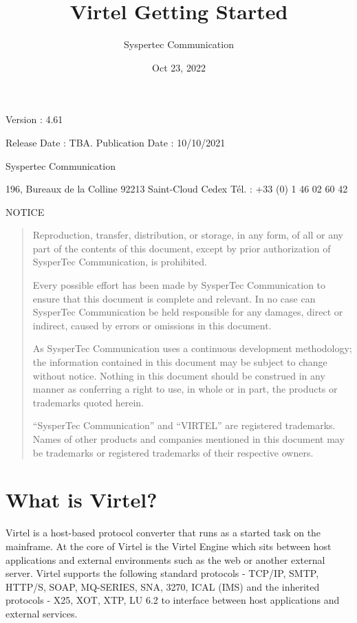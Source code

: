 \documentclass[letterpaper,10pt,english]{sphinxmanual}
\title{Virtel Getting Started}
\date{Oct 23, 2022}
\author{Syspertec Communication}
\begin{document}
\pagestyle{empty}
\sphinxmaketitle
\pagestyle{plain}
\sphinxtableofcontents
\pagestyle{normal}
\label{\detokenize{Getting_Started::doc}}



Version : 4.61

Release Date : TBA. Publication Date : 10/10/2021

Syspertec Communication

196, Bureaux de la Colline 92213 Saint-Cloud Cedex Tél. : +33 (0) 1 46 02 60 42


NOTICE
\begin{quote}

Reproduction, transfer, distribution, or storage, in any form, of all or any part of
the contents of this document, except by prior authorization of SysperTec
Communication, is prohibited.

Every possible effort has been made by SysperTec Communication to ensure that this document
is complete and relevant. In no case can SysperTec Communication be held responsible for
any damages, direct or indirect, caused by errors or omissions in this document.

As SysperTec Communication uses a continuous development methodology; the information
contained in this document may be subject to change without notice. Nothing in this
document should be construed in any manner as conferring a right to use, in whole or in
part, the products or trademarks quoted herein.

“SysperTec Communication” and “VIRTEL” are registered trademarks. Names of other products
and companies mentioned in this document may be trademarks or registered trademarks of
their respective owners.
\end{quote}


\chapter{What is Virtel?}
\label{\detokenize{Getting_Started:what-is-virtel}}
Virtel is a host-based protocol converter that runs as a started task on the mainframe. At the core of Virtel is the Virtel Engine which sits between host applications and external environments such as the web or another external server. Virtel supports the following standard protocols - TCP/IP, SMTP, HTTP/S, SOAP, MQ-SERIES, SNA, 3270, ICAL (IMS) and the inherited protocols - X25, XOT, XTP, LU 6.2 to interface between host applications and external services.
\end{document}
